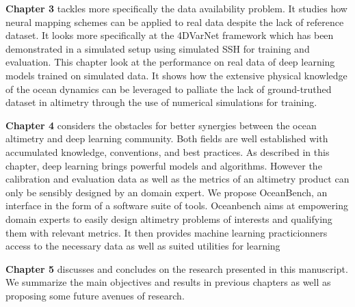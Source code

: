 \begin{bibunit}
\textbf{Chapter 3} tackles more specifically the data availability problem. It studies how neural mapping schemes can be applied to real data despite the lack of reference dataset.
It looks more specifically at the 4DVarNet framework which has been demonstrated in a simulated setup\cite{fabletENDTOENDPHYSICSINFORMEDREPRESENTATION2021} using simulated SSH for training and evaluation.
This chapter look at the performance on real data of deep learning models trained on simulated data.
It shows how the extensive physical knowledge of the ocean dynamics can be leveraged to palliate the lack of ground-truthed dataset in altimetry through the use of numerical simulations for training.

\textbf{Chapter 4} considers the obstacles for better synergies between the ocean altimetry and deep learning community.
Both fields are well established with accumulated knowledge, conventions, and best practices. 
As described in this chapter, deep learning brings powerful models and algorithms.
However the calibration and evaluation data as well as the metrics of an altimetry product can only be sensibly designed by an domain expert. 
We propose OceanBench, an interface in the form of a software suite of tools.
Oceanbench aims at empowering domain experts to easily design altimetry problems of interests and qualifying them with relevant metrics. 
It then provides machine learning practicionners access to the necessary data as well as suited utilities for learning

\textbf{Chapter 5} discusses and concludes on the research presented in this manuscript. We summarize the main objectives and results in previous chapters as well as proposing some future avenues of research.


\end{bibunit}

